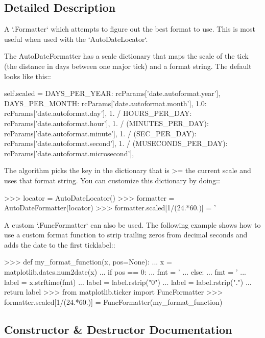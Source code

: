 \subsection{Detailed Description}
\begin{DoxyVerb}A `.Formatter` which attempts to figure out the best format to use.  This
is most useful when used with the `AutoDateLocator`.

The AutoDateFormatter has a scale dictionary that maps the scale
of the tick (the distance in days between one major tick) and a
format string.  The default looks like this::

    self.scaled = {
        DAYS_PER_YEAR: rcParams['date.autoformat.year'],
        DAYS_PER_MONTH: rcParams['date.autoformat.month'],
        1.0: rcParams['date.autoformat.day'],
        1. / HOURS_PER_DAY: rcParams['date.autoformat.hour'],
        1. / (MINUTES_PER_DAY): rcParams['date.autoformat.minute'],
        1. / (SEC_PER_DAY): rcParams['date.autoformat.second'],
        1. / (MUSECONDS_PER_DAY): rcParams['date.autoformat.microsecond'],
    }

The algorithm picks the key in the dictionary that is >= the
current scale and uses that format string.  You can customize this
dictionary by doing::

>>> locator = AutoDateLocator()
>>> formatter = AutoDateFormatter(locator)
>>> formatter.scaled[1/(24.*60.)] = '%

A custom `.FuncFormatter` can also be used.  The following example shows
how to use a custom format function to strip trailing zeros from decimal
seconds and adds the date to the first ticklabel::

    >>> def my_format_function(x, pos=None):
    ...     x = matplotlib.dates.num2date(x)
    ...     if pos == 0:
    ...         fmt = '%
    ...     else:
    ...         fmt = '%
    ...     label = x.strftime(fmt)
    ...     label = label.rstrip("0")
    ...     label = label.rstrip(".")
    ...     return label
    >>> from matplotlib.ticker import FuncFormatter
    >>> formatter.scaled[1/(24.*60.)] = FuncFormatter(my_format_function)
\end{DoxyVerb}
 

\subsection{Constructor \& Destructor Documentation}
\mbox{\label{classmatplotlib_1_1dates_1_1AutoDateFormatter_a856f8f1e4e7c693991d56cc41313ce47}} 
